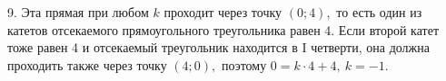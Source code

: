 9. Эта прямая при любом $k$ проходит через точку $(0;4),$ то есть один из катетов отсекаемого прямоугольного треугольника равен 4. Если второй катет тоже равен 4 и отсекаемый треугольник находится в I четверти, она должна проходить также через точку $(4;0),$ поэтому $0=k\cdot4+4,\ k=-1.$\\
